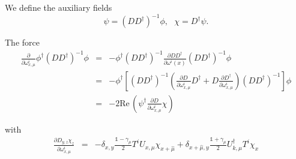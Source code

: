 \documentclass[12pt,a4paper]{article}
\newcommand{\re}{\text{Re}\,}
\begin{document}
We define the auxiliary fields
\begin{equation}
    \psi = \left(DD^{\dagger}\right)^{-1}\phi, \ \ \ \chi = D^{\dagger} \psi .
\end{equation}

The force
\begin{eqnarray}
    \frac{\partial}{\partial \omega^i_{x,\mu}}\phi^{\dagger}\left( DD^{\dagger}\right)^{-1}\phi & = & -\phi^{\dagger}\left( DD^{\dagger}\right)^{-1} \frac{\partial DD^{\dagger}}{\partial \omega^i(x)} \left( DD^{\dagger}\right)^{-1} \phi \\
    & = & -\phi^{\dagger}\left[\left( DD^{\dagger}\right)^{-1}\left( \frac{\partial D}{\partial \omega^i_{x,\mu}}D^{\dagger}+D\frac{\partial D^{\dagger}}{\partial \omega^i_{x,\mu}}\right) \left( DD^{\dagger}\right)^{-1} \right]\phi \\
    & = & -2\re\left(\psi^{\dagger}\frac{\partial D}{\partial \omega^i_{x,\mu}}\chi \right)
\end{eqnarray}

with
\begin{eqnarray}
    \frac{\partial D_{y,z}\chi_z}{\partial \omega_{x,\mu}^i} & = & -\delta_{x,y}\frac{\mathds{1}-\gamma_{\mu}}{2}T^iU_{x,\mu}\chi_{x+\hat{\mu}}+\delta_{x+\hat{\mu},y}\frac{\mathds{1}+\gamma_{\mu}}{2}U^{\dagger}_{k,\mu}T^i\chi_{x}
\end{eqnarray}
\end{document}
